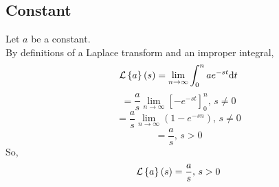 \subsection{Constant}
Let $a$ be a constant.\\
By definitions of a Laplace transform and an improper integral,
\begin{equation*}
	\mathcal{L}\left\{ a \right\}\left(s\right) = \lim\limits_{n\to\infty}{\int_{0}^{n}{ae^{-st}\mathrm{d}t}}
\end{equation*}
\begin{equation*}
	= \frac{a}{s}\lim\limits_{n\to\infty}\left[-e^{-st}\right]_{0}^{n} \text{, } s \neq 0
\end{equation*}
\begin{equation*}
	= \frac{a}{s}\lim\limits_{n\to\infty}{\left(1-e^{-sn}\right)} \text{, } s \neq 0
\end{equation*}
\begin{equation*}
	= \frac{a}{s} \text{, } s > 0 
\end{equation*}
So,
\begin{equation*}
	\mathcal{L}\left\{ a \right\}\left(s\right) = \frac{a}{s} \text{, } s > 0
\end{equation*}